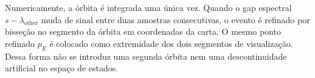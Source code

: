 Numericamente, a órbita é integrada uma única vez. Quando o gap espectral
$s-\lambda_{\mathrm{other}}$ muda de sinal entre duas amostras consecutivas,
o evento é refinado por bisseção no segmento da órbita em coordenadas da
carta. O mesmo ponto refinado $p_E$ é colocado como extremidade dos dois
segmentos de visualização. Dessa forma não se introduz uma segunda órbita nem
uma descontinuidade artificial no espaço de estados.
